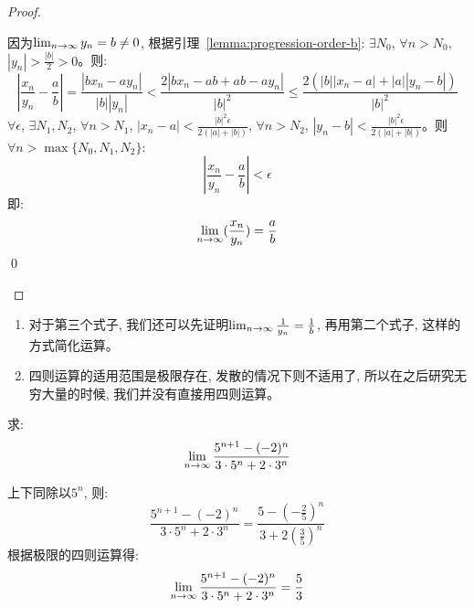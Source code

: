\begin{proof}
\begin{enumerate}
        因为$\lim_{n \to \infty } y_n = b \neq 0$, 根据引理~\ref{lemma:progression-order-b}: $\exists N_0$, $\forall n > N_0$, $|y_n| > \frac{|b|}{2} > 0$。则:
        \begin{equation*}
            \left|\frac{x_n}{y_n} - \frac{a}{b} \right| = \frac{|bx_n - ay_n|}{|b||y_n|} < \frac{2|bx_n-ab+ab-ay_n|}{|b|^2} \le \frac{2(|b||x_n-a|+|a||y_n-b|)}{|b|^2}
        \end{equation*}
        $\forall \epsilon$, $\exists N_1, N_2$, $\forall n > N_1$, $|x_n - a| < \frac{|b|^2\epsilon}{2(|a|+|b|)}$, $\forall n > N_2$, $|y_n - b| < \frac{|b|^2\epsilon}{2(|a|+|b|)}$。则$\forall n > \max\{N_0, N_1, N_2\}$:
        \begin{equation*}
            \left| \frac{x_n}{y_n} - \frac{a}{b} \right| < \epsilon
        \end{equation*}
        即:
        \begin{equation*}
            \lim_{n \to \infty } (\frac{x_n}{y_n}) = \frac{a}{b}
        \end{equation*}
        \qed
    \end{enumerate}
\end{proof}
\begin{remark}
    \begin{enumerate}
        \item 对于第三个式子, 我们还可以先证明$\lim_{n \to \infty } \frac{1}{y_n} = \frac{1}{b}$, 再用第二个式子, 这样的方式简化运算。
        \item 四则运算的适用范围是极限存在, 发散的情况下则不适用了, 所以在之后研究无穷大量的时候, 我们并没有直接用四则运算。
    \end{enumerate}
\end{remark}

\begin{example}
    求:
    \begin{equation*}
        \lim_{n \to \infty } \frac{5^{n+1}-(-2)^n}{3 \cdot 5^n + 2\cdot 3^n} 
    \end{equation*}
\end{example}
\begin{solution}
    上下同除以$5^n$, 则:
    \begin{equation*}
        \frac{5^{n+1}-(-2)^n}{3 \cdot 5^n + 2\cdot 3^n} = \frac{5-\left(-\frac{2}{5}\right)^n}{3+2\left(\frac{3}{5}\right)^n}
    \end{equation*}
    根据极限的四则运算得:
    \begin{equation*}
        \lim_{n \to \infty } \frac{5^{n+1}-(-2)^n}{3 \cdot 5^n + 2\cdot 3^n} = \frac{5}{3}
    \end{equation*}
\end{solution}

